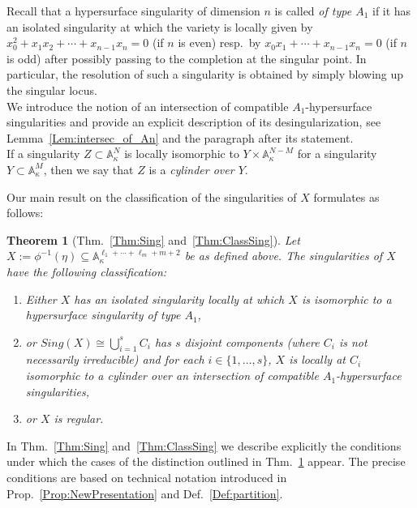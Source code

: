\documentclass[letter,11pt]{amsart}
\renewcommand{\AA}{\ensuremath{\mathbb{A}}}
\newcounter{CountAlpha}
\theoremstyle{theorem}
\newtheorem{MainThm}[CountAlpha]{Theorem}  %
\theoremstyle{definition}
\newcommand{\len}{\ell}
\numberwithin{equation}{section}
\begin{document}
Recall that a hypersurface singularity of dimension $ n $ is called {\em of type $ A_1 $} if it has an isolated singularity at which the variety is locally given by 
$  x_0^2 + x_1 x_2 + \cdots + x_{n-1} x_n  = 0 $ (if $ n $ is even)
resp.~by $ x_0 x_1 + \cdots + x_{n-1} x_n  = 0 $ (if $ n $ is odd)
after possibly passing to the completion at the singular point. 
In particular, the resolution of such a singularity is obtained by simply blowing up the singular locus. 
\\
We introduce the notion of an intersection of compatible $ A_1 $-hypersurface singularities
and provide an explicit description of its desingularization, 
see Lemma~\ref{Lem:intersec_of_An} and the paragraph after its statement.
\\
If a singularity $ Z \subset \AA_\kappa^N $ is locally isomorphic to $ Y \times \AA_\kappa^{N-M} $ for a singularity $ Y \subset \AA_\kappa^M $,
then we say that $ Z $ is a {\em cylinder over $ Y $}. 

Our main result on the classification of the singularities of $ X $ formulates as follows:

\begin{MainThm}[Thm.~\ref{Thm:Sing} and~\ref{Thm:ClassSing}]
	\label{Thm:A}
	Let $ X := \phi^{-1} (\eta) 
	\subseteq \AA_\kappa^{\len_1+\cdots + \len_m+m+2} $ 
	be as defined above. 
	The singularities of $ X $ have the following classification:
	\begin{enumerate}[(1)]
		\item 
		Either $ X $ has an isolated singularity locally at which $ X $ is isomorphic to a hypersurface singularity of type $ A_1 $, 
		
		\item 
		or $ Sing(X) \cong  \bigcup_{i=1}^s  C_i  $ has $ s $ disjoint components (where $ C_i $ is not necessarily irreducible)
		and for each $ i \in \{ 1, \ldots, s \} $,
		$ X $ is locally at $ C_{i} $ isomorphic to a cylinder over an intersection of compatible $ A_1 $-hypersurface singularities, 
		
		\item 
		or $ X $ is regular.
	\end{enumerate}
\end{MainThm}

In Thm.~\ref{Thm:Sing} and~\ref{Thm:ClassSing} we describe explicitly the conditions under which the cases of the distinction outlined in Thm.~\ref{Thm:A} appear.
The precise conditions are based on technical notation introduced in Prop.~\ref{Prop:NewPresentation} and Def.~\ref{Def:partition}.
\end{document}
